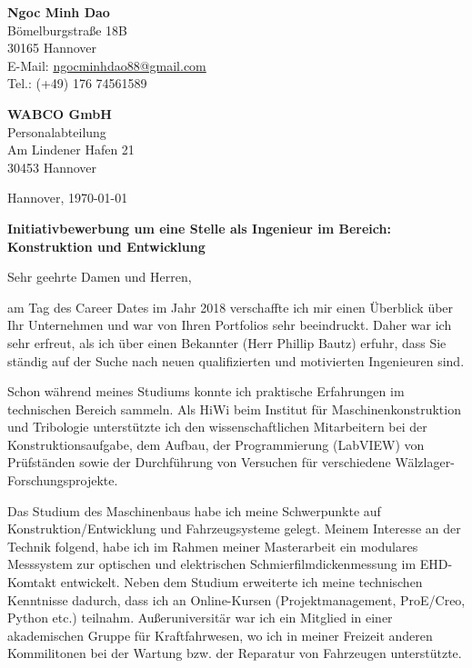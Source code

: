 \documentclass[11pt,a4paper]{letter}
\newcommand{\FirmaName}{WABCO GmbH}
\newcommand{\FirmaAdresseLineOne}{Am Lindener Hafen 21}
\newcommand{\FirmaAdresseLineTwo}{30453 Hannover}
\newcommand{\AnsprechpartnerVoll}{Frau Ellena Domes}
\newcommand{\Ansprechpartner}{Maier}
\newcommand{\Ansprechpartnerin}{Domes}
\begin{document}
\pagestyle{empty}

\begin{flushleft}
    \textbf{Ngoc Minh Dao}\\
    Bömelburgstraße 18B\\
    30165 Hannover\\
    E-Mail: \href{mailto:ngocminhdao88@gmail.com}{ngocminhdao88@gmail.com}\\
    Tel.: (+49) 176 74561589
\end{flushleft}

\begin{flushleft}
    \textbf{\FirmaName}\\
    Personalabteilung\\
    \FirmaAdresseLineOne\\
    \FirmaAdresseLineTwo\\
\end{flushleft}

\begin{flushright}
    Hannover, \today
\end{flushright}

\textbf{Initiativbewerbung um eine Stelle als Ingenieur im Bereich: Konstruktion und Entwicklung}\\
\vspace{1em}

Sehr geehrte Damen und Herren,

am Tag des Career Dates im Jahr 2018 verschaffte ich mir einen Überblick über Ihr Unternehmen und war von Ihren Portfolios sehr beeindruckt.
Daher war ich sehr erfreut, als ich über einen Bekannter (Herr Phillip Bautz) erfuhr, dass Sie ständig auf der Suche nach neuen qualifizierten und motivierten Ingenieuren sind.

Schon während meines Studiums konnte ich praktische Erfahrungen im technischen Bereich sammeln.
Als HiWi beim Institut für Maschinenkonstruktion und Tribologie unterstützte ich den wissenschaftlichen Mitarbeitern bei der Konstruktionsaufgabe, dem Aufbau, der Programmierung (LabVIEW) von Prüfständen sowie der Durchführung von Versuchen für verschiedene Wälzlager-Forschungsprojekte.

Das Studium des Maschinenbaus habe ich meine Schwerpunkte auf Konstruktion/Entwicklung und Fahrzeugsysteme gelegt.
Meinem Interesse an der Technik folgend, habe ich im Rahmen meiner Masterarbeit ein modulares Messsystem zur optischen und elektrischen Schmierfilmdickenmessung im EHD-Komtakt entwickelt.
Neben dem Studium erweiterte ich meine technischen Kenntnisse dadurch, dass ich an Online-Kursen (Projektmanagement, ProE/Creo, Python etc.) teilnahm.
Außeruniversitär war ich ein Mitglied in einer akademischen Gruppe für Kraftfahrwesen, wo ich in meiner Freizeit anderen Kommilitonen bei der Wartung bzw. der Reparatur von Fahrzeugen unterstützte.
\end{document}
